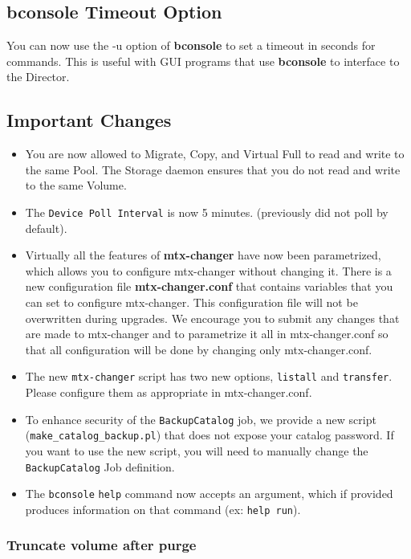 \subsection{bconsole Timeout Option}
You can now use the -u option of {\bf bconsole} to set a timeout in seconds
for commands. This is useful with GUI programs that use {\bf bconsole}
to interface to the Director.

\subsection{Important Changes}
\label{sec:importantchanges}

\begin{itemize}
\item You are now allowed to Migrate, Copy, and Virtual Full to read and write
  to the same Pool. The Storage daemon ensures that you do not read and
  write to the same Volume.
\item The \texttt{Device Poll Interval} is now 5 minutes. (previously did not
  poll by default).
\item Virtually all the features of {\bf mtx-changer} have
  now been parametrized, which allows you to configure
  mtx-changer without changing it. There is a new configuration file {\bf mtx-changer.conf} 
  that contains variables that you can set to configure mtx-changer.
  This configuration file will not be overwritten during upgrades.
  We encourage you to submit any changes
  that are made to mtx-changer and to parametrize it all in
  mtx-changer.conf so that all configuration will be done by
  changing only mtx-changer.conf.
\item The new \texttt{mtx-changer} script has two new options, \texttt{listall}
  and \texttt{transfer}. Please configure them as appropriate
  in mtx-changer.conf.
\item To enhance security of the \texttt{BackupCatalog} job, we provide a new
  script (\texttt{make\_catalog\_backup.pl}) that does not expose your catalog
  password. If you want to use the new script, you will need to 
  manually change the \texttt{BackupCatalog} Job definition.
\item The \texttt{bconsole} \texttt{help} command now accepts
  an argument, which if provided produces information on that
  command (ex: \texttt{help run}).
\end{itemize}


\subsubsection*{Truncate volume after purge}

